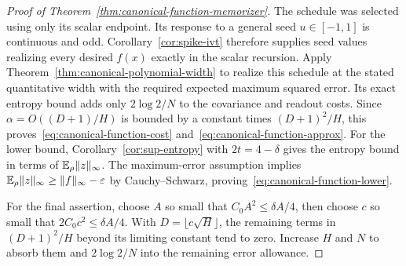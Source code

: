 \begin{proof}[Proof of Theorem~\ref{thm:canonical-function-memorizer}]
The schedule was selected using only its scalar endpoint. Its response to a general seed $u\in[-1,1]$ is continuous and odd. Corollary~\ref{cor:spike-ivt} therefore supplies seed values realizing every desired $f(x)$ exactly in the scalar recursion. Apply Theorem~\ref{thm:canonical-polynomial-width} to realize this schedule at the stated quantitative width with the required expected maximum squared error. Its exact entropy bound adds only $2\log2/N$ to the covariance and readout costs. Since
$\alpha=O((D+1)/H)$ is bounded by a constant times $(D+1)^2/H$, this proves~\eqref{eq:canonical-function-cost} and~\eqref{eq:canonical-function-approx}. For the lower bound, Corollary~\ref{cor:sup-entropy} with $2t=4-\delta$ gives the entropy bound in terms of $\mathbb E_\rho\|z\|_\infty$. The maximum-error assumption implies $\mathbb E_\rho\|z\|_\infty\ge\|f\|_\infty-\varepsilon$ by Cauchy--Schwarz, proving~\eqref{eq:canonical-function-lower}.

For the final assertion, choose $A$ so small that $C_0A^2\le\delta A/4$, then choose $c$ so small that $2C_0c^2\le\delta A/4$. With $D=\lfloor c\sqrt H\rfloor$, the remaining terms in $(D+1)^2/H$ beyond its limiting constant tend to zero. Increase $H$ and $N$ to absorb them and $2\log2/N$ into the remaining error allowance.
\end{proof}
